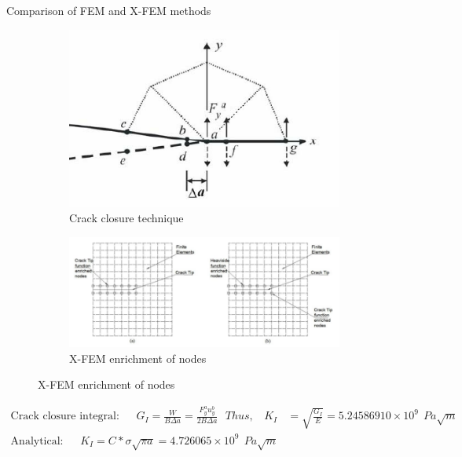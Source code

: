 \documentclass{beamer}
\begin{document}
\begin{frame}[t,fragile]{Comparison of FEM and X-FEM methods}
    \vspace{-.9cm}
    \hspace{15pt}
        \begin{figure}[H]
    \begin{subfigure}{0.45\textwidth}
    \centering
    \includegraphics[scale=.2]{crackclosure.png}
    \caption{\tiny Crack closure technique}
\end{subfigure}
        \hspace{15pt}
       \begin{subfigure}{0.45\textwidth}
    \centering
      \includegraphics[scale=.15]{k.png}
    \caption{\tiny X-FEM enrichment of nodes}
\end{subfigure}
\end{figure}
\vspace{-12pt}
    \tiny    
\begin{align*}
       \text{Crack closure integral:}\ \ \ \ \ \ \ G_I=\frac{W}{B\Delta a}=\frac{F_{y}^au_{y}^b}{2B \Delta a}\ \ \ Thus, \ \ \ \
    K_I&=\sqrt{\frac{G_I}{E}}=5.24586910\times 10^9\ \ Pa\sqrt{m}\\ 
   \text{Analytical:}\ \ \ \ \ \ \ K_I=C*\sigma\sqrt{\pi a}=4.726065 \times 10^9\ \ Pa\sqrt{m}\\
\end{align*}

\end{frame}
\end{document}
